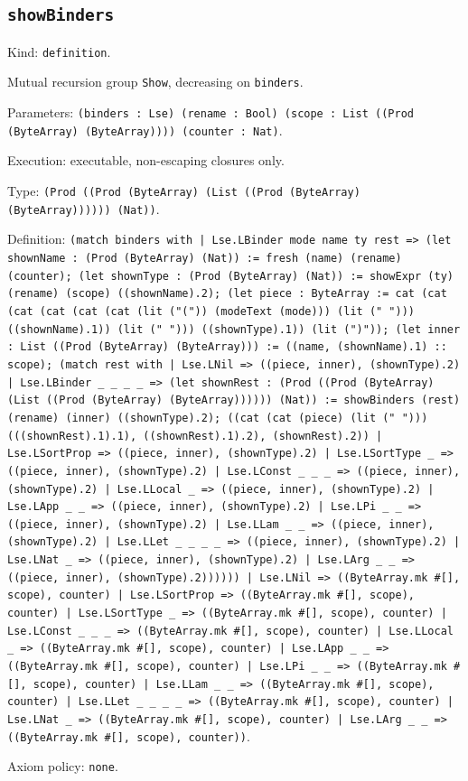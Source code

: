 \documentclass[11pt]{article}
\begin{document}
\subsection*{\texttt{showBinders}}
\noindent Kind: \texttt{definition}.\par
\noindent Mutual recursion group \texttt{Show}, decreasing on \texttt{binders}.\par
\noindent Parameters: \texttt{(binders : Lse) (rename : Bool) (scope : List ((Prod (ByteArray) (ByteArray)))) (counter : Nat)}.\par
\noindent Execution: executable, non-escaping closures only.\par
\noindent Type: \texttt{(Prod ((Prod (ByteArray) (List ((Prod (ByteArray) (ByteArray)))))) (Nat))}.\par
\noindent Definition: \texttt{(match binders with | Lse.LBinder mode name ty rest => (let shownName : (Prod (ByteArray) (Nat)) := fresh (name) (rename) (counter); (let shownType : (Prod (ByteArray) (Nat)) := showExpr (ty) (rename) (scope) ((shownName).2); (let piece : ByteArray := cat (cat (cat (cat (cat (cat (lit ("(")) (modeText (mode))) (lit (" "))) ((shownName).1)) (lit (" "))) ((shownType).1)) (lit (")")); (let inner : List ((Prod (ByteArray) (ByteArray))) := ((name, (shownName).1) :: scope); (match rest with | Lse.LNil => ((piece, inner), (shownType).2) | Lse.LBinder \_ \_ \_ \_ => (let shownRest : (Prod ((Prod (ByteArray) (List ((Prod (ByteArray) (ByteArray)))))) (Nat)) := showBinders (rest) (rename) (inner) ((shownType).2); ((cat (cat (piece) (lit (" "))) (((shownRest).1).1), ((shownRest).1).2), (shownRest).2)) | Lse.LSortProp => ((piece, inner), (shownType).2) | Lse.LSortType \_ => ((piece, inner), (shownType).2) | Lse.LConst \_ \_ \_ => ((piece, inner), (shownType).2) | Lse.LLocal \_ => ((piece, inner), (shownType).2) | Lse.LApp \_ \_ => ((piece, inner), (shownType).2) | Lse.LPi \_ \_ => ((piece, inner), (shownType).2) | Lse.LLam \_ \_ => ((piece, inner), (shownType).2) | Lse.LLet \_ \_ \_ \_ => ((piece, inner), (shownType).2) | Lse.LNat \_ => ((piece, inner), (shownType).2) | Lse.LArg \_ \_ => ((piece, inner), (shownType).2)))))) | Lse.LNil => ((ByteArray.mk \#[], scope), counter) | Lse.LSortProp => ((ByteArray.mk \#[], scope), counter) | Lse.LSortType \_ => ((ByteArray.mk \#[], scope), counter) | Lse.LConst \_ \_ \_ => ((ByteArray.mk \#[], scope), counter) | Lse.LLocal \_ => ((ByteArray.mk \#[], scope), counter) | Lse.LApp \_ \_ => ((ByteArray.mk \#[], scope), counter) | Lse.LPi \_ \_ => ((ByteArray.mk \#[], scope), counter) | Lse.LLam \_ \_ => ((ByteArray.mk \#[], scope), counter) | Lse.LLet \_ \_ \_ \_ => ((ByteArray.mk \#[], scope), counter) | Lse.LNat \_ => ((ByteArray.mk \#[], scope), counter) | Lse.LArg \_ \_ => ((ByteArray.mk \#[], scope), counter))}.\par
\noindent Axiom policy: \texttt{none}.\par
\end{document}
